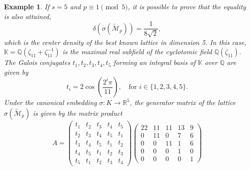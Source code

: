 \documentclass{amsart}
\newtheorem{remark}[theorem]{Remark}
\newtheorem{example}[theorem]{Example}
\begin{document}
\begin{example}
If $s=5$ and $p \equiv 1 \pmod 5$, it is possible to prove that the equality is also attained, \[ \delta(\sigma(\tilde{\mathcal{M}}_p)) = \frac{1}{8\sqrt{2}}, \] 
which is the center density of the best known lattice in dimension 5. In this case, $\mathbb{K} = \mathbb{Q}(\zeta_{11} + \zeta_{11}^{-1})$ is the maximal real subfield of the cyclotomic field $\mathbb{Q}(\zeta_{11})$. The Galois conjugates $t_1, t_2, t_3, t_4, t_5$ forming an integral basis of $\mathbb{K}$ over $\mathbb{Q}$ are given by
\[
t_i = 2 \cos\left( \frac{2^i \pi}{11} \right), \quad \text{for } i \in \{1, 2, 3, 4, 5\}.
\]
Under the canonical embedding $\sigma: K \to \mathbb{R}^5$, the generator matrix of the lattice $\sigma(\tilde{\mathcal{M}}_p)$ is given by the matrix product
\[
A = \begin{pmatrix}
t_1 & t_2 & t_3 & t_4 & t_5 \\
t_2 & t_3 & t_4 & t_5 & t_1 \\
t_3 & t_4 & t_5 & t_1 & t_2 \\
t_4 & t_5 & t_1 & t_2 & t_3 \\
t_5 & t_1 & t_2 & t_3 & t_4
\end{pmatrix}
\begin{pmatrix}
22 & 11 & 11 & 13 & 9 \\
0 & 11 & 0 & 7 & 6 \\
0 & 0 & 11 & 1 & 6 \\
0 & 0 & 0 & 1 & 0 \\
0 & 0 & 0 & 0 & 1
\end{pmatrix}
\]
\end{example} 

\end{document}
